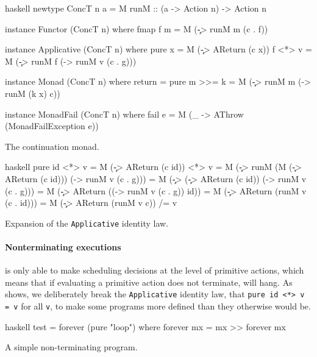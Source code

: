 \begin{listing}
\centering
\begin{cminted}{haskell}
newtype ConcT n a = M { runM :: (a -> Action n) -> Action n }

instance Functor (ConcT n) where
  fmap f m = M (\c -> runM m (c . f))

instance Applicative (ConcT n) where
  pure x  = M (\c -> AReturn (c x))
  f <*> v = M (\c -> runM f (\g -> runM v (c . g)))

instance Monad (ConcT n) where
  return  = pure
  m >>= k = M (\c -> runM m (\x -> runM (k x) c))

instance MonadFail (ConcT n) where
  fail e = M (\_ -> AThrow (MonadFailException e))
\end{cminted}
\caption{The \dejafu{} continuation monad.}\label{lst:m}
\end{listing}

\begin{listing}
\centering
\begin{cminted}{haskell}
pure id <*> v
  = M (\c -> AReturn (c id)) <*> v
  = M (\c -> runM (M (\c -> AReturn (c id))) (\g -> runM v (c . g)))
  = M (\c -> (\c -> AReturn (c id)) (\g -> runM v (c . g)))
  = M (\c -> AReturn ((\g -> runM v (c . g)) id))
  = M (\c -> AReturn (runM v (c . id)))
  = M (\c -> AReturn (runM v c))
 /= v
\end{cminted}
\caption{Expansion of the \texttt{Applicative} identity law.}\label{lst:areturn}
\end{listing}

\paragraph{Nonterminating executions}
\dejafu{} is only able to make scheduling decisions at the level of
primitive actions, which means that if evaluating a primitive action
does not terminate, \dejafu{} will hang.  As  shows,
we deliberately break the \verb|Applicative| identity law, that
\verb|pure id <*> v = v| for all \verb|v|, to make some programs more
defined than they otherwise would be.

\begin{listing}
\centering
\begin{cminted}{haskell}
test = forever (pure "loop") where
  forever mx = mx >> forever mx
\end{cminted}
\caption{A simple non-terminating program.}\label{lst:forever}
\end{listing}

